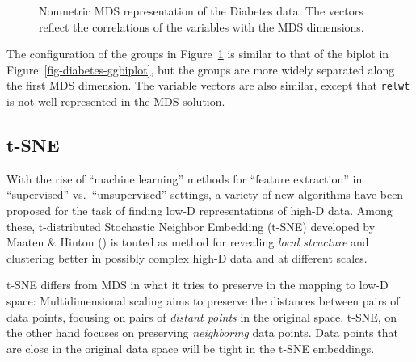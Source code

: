 \documentclass[
  letterpaper,
  10pt,
  krantz2]{krantz}
\begin{document}
\begin{figure}[H]


\caption{\label{fig-diabetes-mds}Nonmetric MDS representation of the
Diabetes data. The vectors reflect the correlations of the variables
with the MDS dimensions.}

\end{figure}%

The configuration of the groups in Figure~\ref{fig-diabetes-mds} is
similar to that of the biplot in Figure~\ref{fig-diabetes-ggbiplot}, but
the groups are more widely separated along the first MDS dimension. The
variable vectors are also similar, except that \texttt{relwt} is not
well-represented in the MDS solution.

\subsection{t-SNE}\label{t-sne}

With the rise of ``machine learning'' methods for ``feature extraction''
in ``supervised'' vs.~``unsupervised'' settings, a variety of new
algorithms have been proposed for the task of finding low-D
representations of high-D data. Among these, t-distributed Stochastic
Neighbor Embedding (t-SNE) developed by Maaten \& Hinton
() is touted as method for
revealing \emph{local structure} and clustering better in possibly
complex high-D data and at different scales.

t-SNE differs from MDS in what it tries to preserve in the mapping to
low-D space: Multidimensional scaling aims to preserve the distances
between pairs of data points, focusing on pairs of \emph{distant points}
in the original space. t-SNE, on the other hand focuses on preserving
\emph{neighboring} data points. Data points that are close in the
original data space will be tight in the t-SNE embeddings.
\end{document}
